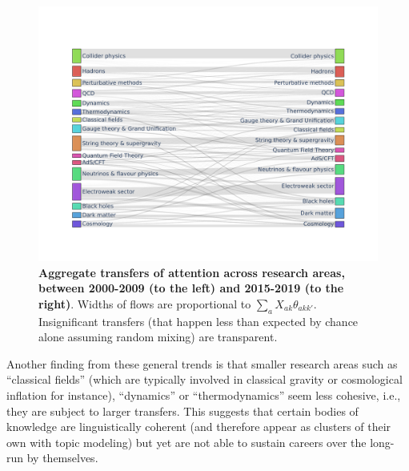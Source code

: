 \documentclass{article}
\begin{document}
 \begin{figure}[h]
     \centering
     \includegraphics[width=\textwidth]{plots/sankey_control_nu.pdf}
     \caption{\textbf{Aggregate transfers of attention across research areas, between 2000-2009 (to the left) and 2015-2019 (to the right)}. Widths of flows are proportional to $\sum_a X_{ak}\theta_{akk'}$. Insignificant transfers (that happen less than expected by chance alone assuming random mixing) are transparent. }
     \label{fig:sankey}
 \end{figure}

Another finding from these general trends is that smaller research areas such as ``classical fields'' (which are typically involved in classical gravity or cosmological inflation for instance), ``dynamics'' or ``thermodynamics'' seem less cohesive, i.e., they are subject to larger transfers. This suggests that certain bodies of knowledge are linguistically coherent (and therefore appear as clusters of their own with topic modeling) but yet are not able to sustain careers over the long-run by themselves.
\end{document}
